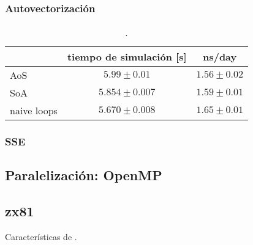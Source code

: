 \documentclass[a4paper,spanish,12pt,twoside]{article}
\begin{document}
\subsubsection*{Autovectorización}

\begin{table}[h]
	\centering
	\caption{.}
	\label{tab:autovec}
	\begin{tabular}{|l|c|c|}
		\hline
	            	& tiempo de simulación [s] & ns/day           \\
	    \hline
		AoS         & $5.99  \pm 0.01$         & $1.56 \pm 0.02$  \\ 
		SoA         & $5.854 \pm 0.007$        & $1.59 \pm 0.01$  \\
		naive loops & $5.670 \pm 0.008$        & $1.65 \pm 0.01$  \\
		\hline
	\end{tabular}
\end{table}

\subsubsection*{SSE}

\subsection{Paralelización: OpenMP}

\clearpage
\pagebreak

\begin{appendices}
	\section{zx81}\label{app:zx81}
	Características de .
\end{appendices}
\end{document}
